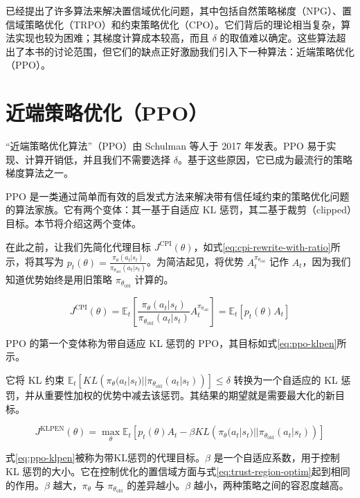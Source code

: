 \documentclass[lang=cn,newtx,10pt,scheme=chinese]{elegantbook}
\begin{document}
已经提出了许多算法来解决置信域优化问题，其中包括自然策略梯度（NPG）、置信域策略优化（TRPO）和约束策略优化（CPO）。它们背后的理论相当复杂，算法实现也较为困难；其梯度计算成本较高，而且 $\delta$ 的取值难以确定。这些算法超出了本书的讨论范围，但它们的缺点正好激励我们引入下一种算法：近端策略优化（PPO）。

\section{近端策略优化（PPO）}

``近端策略优化算法''（PPO）由 Schulman 等人于 2017 年发表。PPO 易于实现、计算开销低，并且我们不需要选择 $\delta$。基于这些原因，它已成为最流行的策略梯度算法之一。

PPO 是一类通过简单而有效的启发式方法来解决带有信任域约束的策略优化问题的算法家族。它有两个变体：其一基于自适应 KL 惩罚，其二基于裁剪（clipped）目标。本节将介绍这两个变体。

在此之前，让我们先简化代理目标 $J^\text{CPI}(\theta)$，如式\ref{eq:cpi-rewrite-with-ratio}所示，将其写为 $p_t(\theta)=\frac{\pi_\theta(a_t|s_t)}{\pi_{\theta_\text{old}}(a_t|s_t)}$。为简洁起见，将优势 $A_t^{\pi_{\theta_\text{old}}}$ 记作 $A_t$，因为我们知道优势始终是用旧策略 $\pi_{\theta_\text{old}}$ 计算的。

\begin{equation}\label{eq:cpi-rewrite-with-ratio}
J^\text{CPI}(\theta) = \mathbb{E}_t\left[ \frac{\pi_\theta(a_t|s_t)}{\pi_{\theta_\text{old}}(a_t|s_t)}A_t^{\pi_{\theta_\text{old}}} \right] = \mathbb{E}_t\left[ p_t(\theta)A_t \right]
\end{equation}

PPO 的第一个变体称为带自适应 KL 惩罚的 PPO，其目标如式\ref{eq:ppo-klpen}所示。

它将 KL 约束 $\mathbb{E}_t[KL\left(\pi_\theta(a_t|s_t)||\pi_{\theta_\text{old}}(a_t|s_t)\right)]\leq\delta$ 转换为一个自适应的 KL 惩罚，并从重要性加权的优势中减去该惩罚。其结果的期望就是需要最大化的新目标。

\begin{equation}\label{eq:ppo-klpen}
J^{\text{KLPEN}}(\theta) = \max_\theta\mathbb{E}_t\left[ p_t(\theta)A_t - \beta KL\left(\pi_\theta(a_t|s_t)||\pi_{\theta_\text{old}}(a_t|s_t)\right) \right]
\end{equation}

式\ref{eq:ppo-klpen}被称为带KL惩罚的代理目标。$\beta$ 是一个自适应系数，用于控制 KL 惩罚的大小。它在控制优化的置信域方面与式\ref{eq:trust-region-optim}起到相同的作用。$\beta$ 越大，$\pi_\theta$ 与 $\pi_{\theta_\text{old}}$ 的差异越小。$\beta$ 越小，两种策略之间的容忍度越高。
\end{document}
